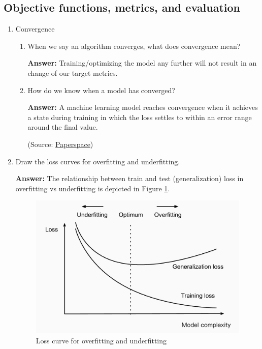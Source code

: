 \documentclass{article}
\newenvironment{QandA}{\begin{enumerate}[label=\arabic*.]}{\end{enumerate}}
\newenvironment{InnerQandA}{\begin{enumerate}[label=\roman*.]}{\end{enumerate}}
\newenvironment{answer}{\par\normalfont \textbf{Answer:}}{}
\begin{document}
\subsection{Objective functions, metrics, and evaluation}
\begin{QandA}
    \item Convergence
    \begin{InnerQandA}
        \item When we say an algorithm converges, what does convergence mean?
        \begin{answer}
            Training/optimizing the model any further will not result in an change of our target metrics.
        \end{answer}

        \item How do we know when a model has converged?
        \begin{answer}
            A machine learning model reaches convergence when it achieves a state during training in which the loss settles to within an error range around the final value.

            (Source: \href{https://machine-learning.paperspace.com/wiki/convergence}{Paperspace})
        \end{answer}
    \end{InnerQandA}

    \item Draw the loss curves for overfitting and underfitting.
    \begin{answer}
        The relationship between train and test (generalization) loss in overfitting vs underfitting is depicted in Figure \ref{fig:overfitting_underfitting}.
    
        \begin{figure}[htb!]
            \centering
            \includegraphics[width=0.7\columnwidth]{img/overfitting-vs-underfitting.png}
            \caption{Loss curve for overfitting and underfitting \footnotemark }
            \label{fig:overfitting_underfitting}
        \end{figure}
    \end{answer}


\end{QandA}
\end{document}
